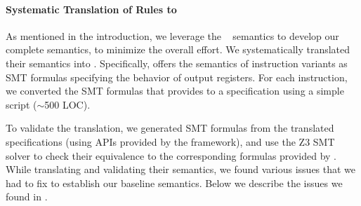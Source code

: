 \paragraph{Systematic Translation of \Strata Rules to \K}
%
As mentioned in the introduction, we leverage the \Strata~\cite{Heule2016a} semantics to develop our complete semantics, to minimize the overall effort.
We systematically translated their semantics into \K.
%
Specifically, \Strata offers the semantics of \strataWithDupIS{} instruction variants as SMT formulas specifying the behavior of output registers.
For each instruction, we converted the SMT formulas that \Strata provides to a \K specification using a simple script ($\sim$500 LOC).

To validate the translation, we generated SMT formulas from the translated \K specifications (using APIs provided by the \K framework), and use the Z3 SMT solver to check their equivalence to the corresponding formulas provided by \Strata.
%
While translating and validating their semantics, we found various issues that we had to fix to establish our baseline semantics.
%
Below we describe the issues we found in \Strata.%








